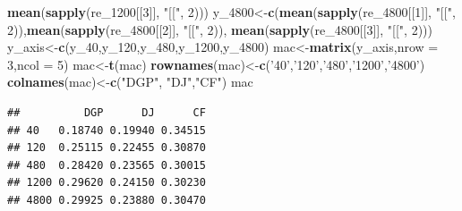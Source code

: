 \documentclass[
]{article}
\newenvironment{Shaded}{\begin{snugshade}}{\end{snugshade}}
\newcommand{\DataTypeTok}[1]{\textcolor[rgb]{0.13,0.29,0.53}{#1}}
\newcommand{\DecValTok}[1]{\textcolor[rgb]{0.00,0.00,0.81}{#1}}
\newcommand{\KeywordTok}[1]{\textcolor[rgb]{0.13,0.29,0.53}{\textbf{#1}}}
\newcommand{\NormalTok}[1]{#1}
\newcommand{\StringTok}[1]{\textcolor[rgb]{0.31,0.60,0.02}{#1}}
\begin{document}
\begin{Shaded}
\begin{Highlighting}[]
        \KeywordTok{mean}\NormalTok{(}\KeywordTok{sapply}\NormalTok{(re_}\DecValTok{1200}\NormalTok{[[}\DecValTok{3}\NormalTok{]], }\StringTok{"[["}\NormalTok{, }\DecValTok{2}\NormalTok{)))}
\NormalTok{y_}\DecValTok{4800}\NormalTok{<-}\KeywordTok{c}\NormalTok{(}\KeywordTok{mean}\NormalTok{(}\KeywordTok{sapply}\NormalTok{(re_}\DecValTok{4800}\NormalTok{[[}\DecValTok{1}\NormalTok{]], }\StringTok{"[["}\NormalTok{, }\DecValTok{2}\NormalTok{)),}\KeywordTok{mean}\NormalTok{(}\KeywordTok{sapply}\NormalTok{(re_}\DecValTok{4800}\NormalTok{[[}\DecValTok{2}\NormalTok{]], }\StringTok{"[["}\NormalTok{, }\DecValTok{2}\NormalTok{)),}
        \KeywordTok{mean}\NormalTok{(}\KeywordTok{sapply}\NormalTok{(re_}\DecValTok{4800}\NormalTok{[[}\DecValTok{3}\NormalTok{]], }\StringTok{"[["}\NormalTok{, }\DecValTok{2}\NormalTok{)))}
\NormalTok{y_axis<-}\KeywordTok{c}\NormalTok{(y_}\DecValTok{40}\NormalTok{,y_}\DecValTok{120}\NormalTok{,y_}\DecValTok{480}\NormalTok{,y_}\DecValTok{1200}\NormalTok{,y_}\DecValTok{4800}\NormalTok{)}
\NormalTok{mac<-}\KeywordTok{matrix}\NormalTok{(y_axis,}\DataTypeTok{nrow =} \DecValTok{3}\NormalTok{,}\DataTypeTok{ncol =} \DecValTok{5}\NormalTok{)}
\NormalTok{mac<-}\KeywordTok{t}\NormalTok{(mac)}
\KeywordTok{rownames}\NormalTok{(mac)<-}\KeywordTok{c}\NormalTok{(}\StringTok{'40'}\NormalTok{,}\StringTok{'120'}\NormalTok{,}\StringTok{'480'}\NormalTok{,}\StringTok{'1200'}\NormalTok{,}\StringTok{'4800'}\NormalTok{)}
\KeywordTok{colnames}\NormalTok{(mac)<-}\KeywordTok{c}\NormalTok{(}\StringTok{"DGP"}\NormalTok{, }\StringTok{"DJ"}\NormalTok{,}\StringTok{"CF"}\NormalTok{)}
\NormalTok{mac}
\end{Highlighting}
\end{Shaded}

\begin{verbatim}
##          DGP      DJ      CF
## 40   0.18740 0.19940 0.34515
## 120  0.25115 0.22455 0.30870
## 480  0.28420 0.23565 0.30015
## 1200 0.29620 0.24150 0.30230
## 4800 0.29925 0.23880 0.30470
\end{verbatim}
\end{document}
